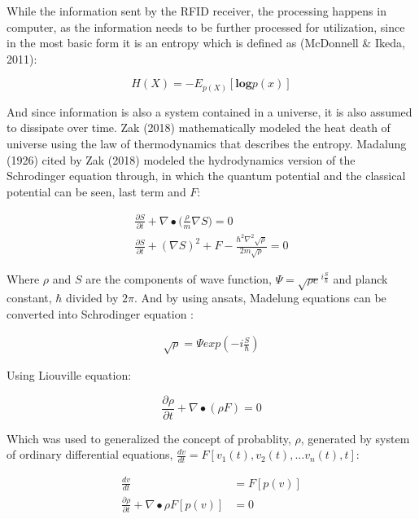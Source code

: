 \documentclass[12pt]{article}
\begin{document}
While the information sent by the RFID receiver, the processing happens in computer, as the information needs to be further processed for utilization, since in the most basic form it is an entropy which is defined as (McDonnell \& Ikeda, 2011):

\begin{equation}
	H(X) = -E_{p(X)} [\boldsymbol{log} p(x)]
\end{equation}

And since information is also a system contained in a universe, it is also assumed to dissipate over time. Zak (2018) mathematically modeled the heat death of universe using the law of thermodynamics that describes the entropy. Madalung (1926) cited by Zak (2018) modeled the hydrodynamics version of the Schrodinger equation through, in which the quantum potential and the classical potential can be seen, last term and $F$:

\begin{align}
	\frac{\partial S}{\partial t} + \nabla \bullet \Big ( \frac{\rho}{m} \nabla S \Big ) = 0 \label{s1} \\
	\frac{\partial S}{\partial t} + (\nabla S)^2 + F - \frac{\hbar^2 \nabla^2 \sqrt{\rho}}{2m \sqrt{\rho}} = 0 \label{s2}
\end{align}

Where $\rho$ and $S$ are the components of wave function, $\Psi = \sqrt{\rho e}^{i\frac{S}{\hbar}}$ and planck constant, $\hbar$ divided by $2\pi$. And by using ansats, Madelung equations can be converted into Schrodinger equation :

\begin{align*}
	\sqrt{\rho} = \Psi exp(-i \frac{S}{\hbar})
\end{align*}

Using Liouville equation:

\begin{equation}
	\frac{\partial \rho}{\partial t} + \nabla \bullet (\rho F) = 0
\end{equation}

Which was used to generalized the concept of probablity, $\rho$, generated by system of ordinary differential equations, $\frac{dv}{dt} = F[v_1 (t), v_2(t), \dots v_n (t), t]$:

\begin{align}
	\frac{dv}{dt} &= F[p(v)] \label{s3} \\
	\frac{\partial \rho}{\partial t} + \nabla \bullet {\rho F[p(v)]} &= 0 \label{s4}
\end{align}
\end{document}
